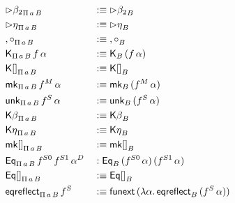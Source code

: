 \documentclass[acmsmall,screen]{acmart}
\begin{document}
{\begin{alignat*}{5}
  & {\rhd\beta_2}_{\Pi\,a\,B}  && :\equiv {\rhd\beta_2}_B \\
  & {\rhd\eta}_{\Pi\,a\,B}  && :\equiv {\rhd\eta}_B \\
  & {,\circ}_{\Pi\,a\,B}  && :\equiv {,\circ}_B \\
  & \mathsf{K}_{\Pi\,a\,B}\,f\,\alpha  && :\equiv \mathsf{K}_B\,(f\,\alpha) \\
  & {\mathsf{K}[]}_{\Pi\,a\,B}  && :\equiv {\mathsf{K}[]}_B \\
  & \mathsf{mk}_{\Pi\,a\,B}\,f^M\,\alpha && :\equiv \mathsf{mk}_B\,(f^M\,\alpha)\\
  & \mathsf{unk}_{\Pi\,a\,B}\,f^S\,\alpha  && :\equiv \mathsf{unk}_B\,(f^S\,\alpha) \\
  & {\mathsf{K}\beta}_{\Pi\,a\,B}  && :\equiv {\mathsf{K}\beta}_B \\
  & {\mathsf{K}\eta}_{\Pi\,a\,B}  && :\equiv {\mathsf{K}\eta}_B \\
  & {\mathsf{mk}[]}_{\Pi\,a\,B}  && :\equiv {\mathsf{mk}[]}_B \\
  & \mathsf{Eq}_{\Pi\,a\,B}\,f^{S0}\,f^{S1}\,\alpha^D  && : \mathsf{Eq}_B\,(f^{S0}\,\alpha)\,(f^{S1}\,\alpha) \\
  & {\mathsf{Eq}[]}_{\Pi\,a\,B} && :\equiv {\mathsf{Eq}[]}_B \\
  & \mathsf{eqreflect}_{\Pi\,a\,B}\,f^S && :\equiv \mathsf{funext}\,(\lambda\alpha.\,\mathsf{eqreflect}_B\,(f^S\,\alpha))
\end{alignat*}
}
\end{document}
